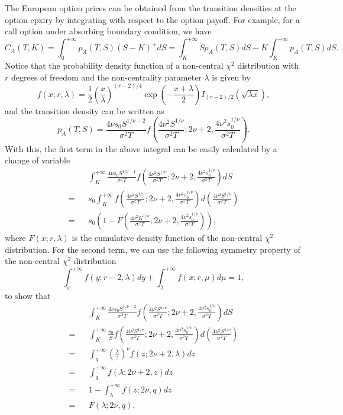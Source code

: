 \documentclass[12pt]{article}
\begin{document}
  The European option prices can be obtained from the transition densities at the option epxiry by integrating with respect to the
  option payoff. For example, for a call option under absorbing boundary condition, we have
  \begin{equation}
    C_A(T,K)=\int_0^{+\infty}p_A(T,S)(S-K)^+dS = \int_K^{+\infty}Sp_A(T,S)dS - K\int_K^{+\infty}p_A(T,S)dS.
  \end{equation}
  Notice that the probability density function of a non-central $\chi^2$ distribution with $r$ degrees of freedom and the non-centrality
  parameter $\lambda$ is given by
  \begin{equation}
    f(x;r,\lambda) = \frac{1}{2}\left(\frac{x}{\lambda}\right)^{(r-2)/4}\exp\left(-\frac{x+\lambda}{2}\right)I_{(r-2)/2}\left(\sqrt{\lambda x}\right),
  \end{equation}
  and the transition density can be written as
  \begin{equation}
    p_A(T,S) = \frac{4\nu s_0 S^{1/\nu-2}}{\sigma^2T}f\left(\frac{4\nu^2S^{1/\nu}}{\sigma^2T};2\nu+2,\frac{4\nu^2s_0^{1/\nu}}{\sigma^2T}\right).
  \end{equation}
  With this, the first term in the above integral can be easily calculated by a change of variable
  \begin{eqnarray}
      && \int_K^{+\infty}\frac{4\nu s_0 S^{1/\nu-1}}{\sigma^2T}f\left(\frac{4\nu^2S^{1/\nu}}{\sigma^2T};2\nu+2,\frac{4\nu^2s_0^{1/\nu}}{\sigma^2T}\right)dS\nonumber\\
    = && s_0\int_K^{+\infty}f\left(\frac{4\nu^2S^{1/\nu}}{\sigma^2T};2\nu+2,\frac{4\nu^2s_0^{1/\nu}}{\sigma^2T}\right)d\left(\frac{4\nu^2S^{1/\nu}}{\sigma^2T}\right)\nonumber\\
    = && s_0\left(1 - F\left(\frac{4\nu^2K^{1/\nu}}{\sigma^2T};2\nu+2,\frac{4\nu^2s_0^{1/\nu}}{\sigma^2T}\right)\right),
  \end{eqnarray}
  where $F(x;r,\lambda)$ is the cumulative density function of the non-central $\chi^2$ distribution.
  For the second term, we can use the following symmetry property of the non-central $\chi^2$ distribution
  \begin{equation}
    \int_x^{+\infty}f(y;r-2,\lambda)dy + \int_{\lambda}^{+\infty}f(x;r,\mu)d\mu = 1,
  \end{equation}
  to show that
  \begin{eqnarray}
      && \int_K^{+\infty}\frac{4\nu s_0 S^{1/\nu-2}}{\sigma^2T}f\left(\frac{4\nu^2S^{1/\nu}}{\sigma^2T};2\nu+2,\frac{4\nu^2s_0^{1/\nu}}{\sigma^2T}\right)dS\nonumber\\
    = && \int_K^{+\infty}\frac{s_0}{S}f\left(\frac{4\nu^2S^{1/\nu}}{\sigma^2T};2\nu+2,\frac{4\nu^2s_0^{1/\nu}}{\sigma^2T}\right)d\left(\frac{4\nu^2S^{1/\nu}}{\sigma^2T}\right)\nonumber\\
    = && \int_q^{+\infty}\left(\frac{\lambda}{z}\right)^{\nu}f\left(z;2\nu+2,\lambda\right)dz \nonumber\\
    = && \int_q^{+\infty}f\left(\lambda;2\nu+2,z\right)dz \nonumber\\
    = && 1 - \int_{\lambda}^{+\infty}f\left(z;2\nu,q\right)dz \nonumber\\
    = && F(\lambda; 2\nu, q),
  \end{eqnarray}
\end{document}
